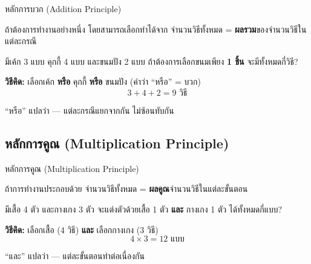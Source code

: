 \documentclass[11pt, aspectratio=169]{beamer}
\begin{document}
\begin{frame}{หลักการบวก (Addition Principle)}
  \begin{explanation}[หลักการบวก]
    ถ้าต้องการทำงานอย่างหนึ่ง โดยสามารถเลือกทำได้จาก 
    จำนวนวิธีทั้งหมด = \textbf{ผลรวม}ของจำนวนวิธีในแต่ละกรณี
  \end{explanation}

  \begin{exambox}
    มีเค้ก 3 แบบ คุกกี้ 4 แบบ และขนมปัง 2 แบบ
    ถ้าต้องการเลือกขนมเพียง \textbf{1 ชิ้น} จะมีทั้งหมดกี่วิธี?

    \medskip
    \textbf{วิธีคิด:} เลือกเค้ก \textbf{หรือ} คุกกี้ \textbf{หรือ} ขนมปัง (คำว่า ``หรือ'' = บวก)
    \[
      3 + 4 + 2 = 9 \text{ วิธี}
    \]
  \end{exambox}

  \begin{intuition}[คิดง่าย ๆ]
    ``หรือ'' แปลว่า  — แต่ละกรณีแยกจากกัน ไม่ซ้อนทับกัน
  \end{intuition}
\end{frame}

\subsection{หลักการคูณ (Multiplication Principle)}

\begin{frame}{หลักการคูณ (Multiplication Principle)}
  \begin{explanation}[หลักการคูณ]
    ถ้าการทำงานประกอบด้วย  จำนวนวิธีทั้งหมด = \textbf{ผลคูณ}จำนวนวิธีในแต่ละขั้นตอน
  \end{explanation}

  \begin{exambox}
    มีเสื้อ 4 ตัว และกางเกง 3 ตัว
    จะแต่งตัวด้วยเสื้อ 1 ตัว \textbf{และ} กางเกง 1 ตัว ได้ทั้งหมดกี่แบบ?

    \medskip
    \textbf{วิธีคิด:} เลือกเสื้อ (4 วิธี) \textbf{และ} เลือกกางเกง (3 วิธี)
    \[
      4 \times 3 = 12 \text{ แบบ}
    \]
  \end{exambox}

  \begin{intuition}[คิดง่าย ๆ]
    ``และ'' แปลว่า  — แต่ละขั้นตอนทำต่อเนื่องกัน
  \end{intuition}
\end{frame}
\end{document}
